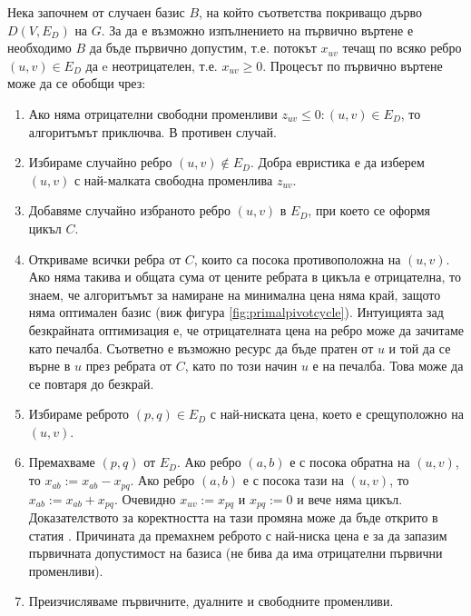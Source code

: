 \documentclass[a4paper,12pt]{article}
\begin{document}
\bigbreak

Нека започнем от случаен базис $B$, на който съответства покриващо дърво $D(V, E_D)$ на $G$. За да е възможно изпълнението на първично въртене е необходимо $B$ да бъде първично допустим, т.е. потокът $x_{uv}$ течащ по всяко ребро $(u, v) \in E_D$ да e неотрицателен, т.е. $x_{uv} \geq 0$. Процесът по първично въртене може да се обобщи чрез:

\begin{enumerate}
    \item Ако няма отрицателни свободни променливи $z_{uv} \le 0: (u, v) \in E_D$, то алгоритъмът приключва. В противен случай.
    \item Избираме случайно ребро $(u, v) \notin E_D$. Добра евристика е да изберем $(u, v)$ с най-малката свободна променлива $z_{uv}$.
    \item Добавяме случайно избраното ребро $(u, v)$ в $E_D$, при което се оформя цикъл $C$.
    \item Откриваме всички ребра от $C$, които са посока противоположна на $(u, v)$. Ако няма такива и общата сума от цените ребрата в цикъла е отрицателна, то знаем, че алгоритъмът за намиране на минимална цена няма край, защото няма оптимален базис (виж фигура \ref{fig:primalpivotcycle}). Интуицията зад безкрайната оптимизация е, че отрицателната цена на ребро може да зачитаме като печалба. Съответно е възможно ресурс да бъде пратен от $u$ и той да се върне в $u$ през ребрата от $C$, като по този начин $u$ е на печалба. Това може да се повтаря до безкрай.
    \item Избираме реброто $(p, q) \in E_D$ с най-ниската цена, което е срещуположно на $(u, v)$.
    \item Премахваме $(p, q)$ от $E_D$. Ако ребро $(a, b)$ е с посока обратна на $(u, v)$, то $x_{ab} := x_{ab} - x_{pq}$. Ако ребро $(a, b)$ е с посока тази на $(u, v)$, то $x_{ab} := x_{ab} + x_{pq}$. Очевидно $x_{uv} := x_{pq}$ и $x_{pq} := 0$ и вече няма цикъл. Доказателството за коректността на тази промяна може да бъде открито в статия \cite{networksimplexmethod}. Причината да премахнем реброто с най-ниска цена е за да запазим първичната допустимост на базиса (не бива да има отрицателни първични променливи).
    \item Преизчисляваме първичните, дуалните и свободните променливи.
\end{enumerate}
\end{document}

